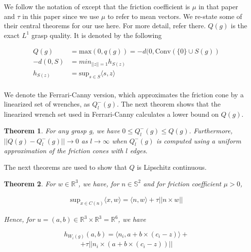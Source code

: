 \documentclass[letterpaper, 10 pt, conference]{ieeeconf}  %
\newtheorem{theorem}{Theorem}
\begin{document}
We follow the notation of \cite{pokorny2013classical} except that the friction coefficient is $\mu$ in that paper and $\tau$ in this paper since we use $\mu$ to refer to mean vectors.  
We re-state some of their central theorems for our use here.
For more detail, refer there.
$Q(g)$ is the exact $L^1$ grasp quality.
It is denoted by the following 

\begin{align}
  Q(g) &= \mbox{max}(0,q(g)) = -d(0,\mbox{Conv}(\{0\} \cup S(g))\\
-d(0,S) &= min_{||z|| = 1} h_{S(z)}\\
h_{S(z)} &= \mbox{sup}_{s\in S}\langle s,z\rangle\\
\end{align}

We denote the Ferrari-Canny version, which approximates the friction cone by a linearized set of wrenches\cite{ferrari1992}, as $Q^-_l(g)$.
The next theorem shows that the linearized wrench set used in Ferrari-Canny calculates a lower bound on $Q(g)$.\\

\begin{theorem}
  \cite{pokorny2013classical}
For any grasp g, we have $0 \leq Q_l^-(g) \leq Q(g)$.
Furthermore, $||Q(g) - Q^-_l(g)|| \rightarrow 0$ as $l \rightarrow \infty$ when $Q_l^-(g)$ is computed using a uniform approximation of the friction cones with $l$ edges. \\
\end{theorem}

The next theorems are used to show that $Q$ is Lipschitz continuous.

\begin{theorem}
\label{lemma35}
  \cite{pokorny2013classical}
For $w \in \mathbb{R}^3$, we have, for $n \in \mathbb{S}^2$ and for friction coefficient $\mu > 0$, 

\begin{align}
\mbox{sup}_{x \in C(n)} \langle x,w \rangle = \langle n,w \rangle + \tau||n \times w||
\end{align}

Hence, for $u = (a,b) \in \mathbb{R}^3 \times \mathbb{R}^3 = \mathbb{R}^6$, we have 

\[
h_{W_i(g)}(a,b) =
 \langle n_i,a+b\times(c_i-z)\rangle +
\]
\begin{align}
 +\tau ||n_i \times (a+b\times(c_i-z))||
\end{align}

\end{theorem}
\end{document}
